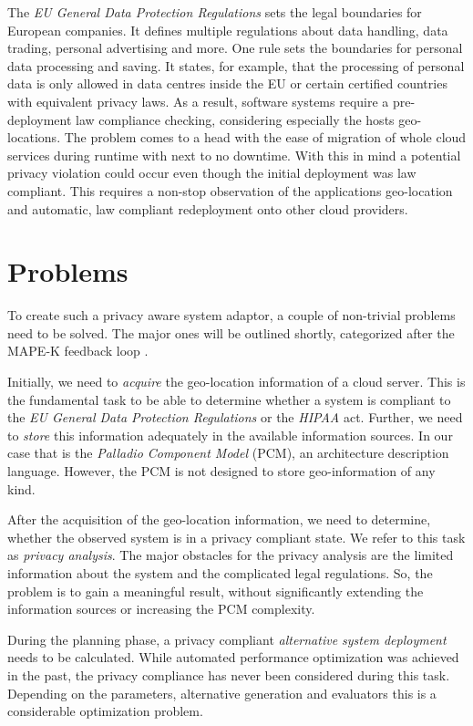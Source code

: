The \textit{EU General Data Protection Regulations} sets the legal boundaries for European companies. It defines multiple regulations about data handling, data trading, personal advertising and more. One rule sets the boundaries for personal data processing and saving. It states, for example, that the processing of personal data is only allowed in data centres inside the EU or certain certified countries with equivalent privacy laws. As a result, software systems require a pre-deployment law compliance checking, considering especially the hosts geo-locations. The problem comes to a head with the ease of migration of whole cloud services during runtime with next to no downtime. With this in mind a potential privacy violation could occur even though the initial deployment was law compliant. This requires a non-stop observation of the applications geo-location and automatic, law compliant redeployment onto other cloud providers.


\section{Problems}
\label{sec:Introduction:problems}

To create such a privacy aware system adaptor, a couple of non-trivial problems need to be solved. The major ones will be outlined shortly, categorized after the MAPE-K feedback loop \cite{Dar.2012}.

Initially, we need to \textit{acquire} the geo-location information of a cloud server. This is the fundamental task to be able to determine whether a system is compliant to the \textit{EU General Data Protection Regulations} or the \textit{HIPAA} act. Further, we need to \textit{store} this information adequately in the available information sources. In our case that is the \textit{Palladio Component Model} (PCM), an architecture description language. However, the PCM is not designed to store geo-information of any kind.

After the acquisition of the geo-location information, we need to determine, whether the observed system is in a privacy compliant state. We refer to this task as \textit{privacy analysis}. The major obstacles for the privacy analysis are the limited information about the system and the complicated legal regulations. So, the problem is to gain a meaningful result, without significantly extending the information sources or increasing the PCM complexity.

During the planning phase, a privacy compliant \textit{alternative system deployment} needs to be calculated. While automated performance optimization was achieved in the past, the privacy compliance has never been considered during this task. Depending on the parameters, alternative generation and evaluators this is a considerable optimization problem.

